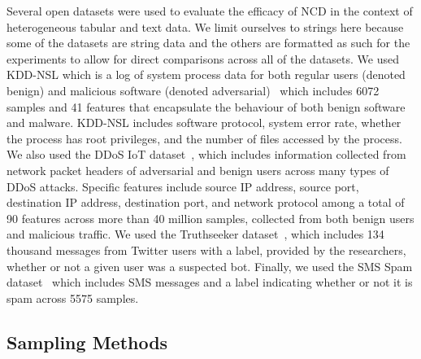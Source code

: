 \documentclass[preprint,12pt]{article}
\begin{document}
Several open datasets were used to evaluate the efficacy of NCD in the context of heterogeneous tabular and text data.
We limit ourselves to strings here because some of the datasets are string data and the others are formatted as such for the experiments to allow for direct comparisons across all of the datasets.
We used KDD-NSL which is a log of system process data for both regular users (denoted benign) and malicious software (denoted adversarial)~\cite{kddnsl} which includes 6072 samples and 41 features that encapsulate the behaviour of both benign software and malware.
KDD-NSL includes software protocol, system error rate, whether the process has root privileges, and the number of files accessed by the process.
We also used the DDoS IoT dataset~\cite{ddos}, which includes information collected from network packet headers of adversarial and benign users across many types of DDoS attacks.
Specific features include source IP address, source port, destination IP address, destination port, and network protocol among a total of 90 features across more than 40 million samples, collected from both benign users and malicious traffic.
We used the Truthseeker dataset~\cite{truthseeker}, which includes 134 thousand messages from Twitter users with a label, provided by the researchers, whether or not a given user was a suspected bot.
Finally, we used the SMS Spam dataset~\cite{sms_spam} which includes SMS messages and a label indicating whether or not it is spam across 5575 samples.



\subsection{Sampling Methods}
\end{document}

